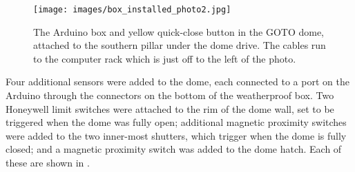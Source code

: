 \begin{colsection}
\begin{figure}[p]
    \begin{center}
        \texttt{[image: images/box\_installed\_photo2.jpg]}
    \end{center}
    \caption[The Arduino box and quick-close button in the GOTO dome]{
        The Arduino box and yellow quick-close button in the GOTO dome, attached to the southern pillar under the dome drive. The cables run to the computer rack which is just off to the left of the photo.
    }\label{fig:arduino_button_dome}
\end{figure}

\clearpage

Four additional sensors were added to the dome, each connected to a port on the Arduino through the connectors on the bottom of the weatherproof box. Two Honeywell limit switches were attached to the rim of the dome wall, set to be triggered when the dome was fully open; additional magnetic proximity switches were added to the two inner-most shutters, which trigger when the dome is fully closed; and a magnetic proximity switch was added to the dome hatch. Each of these are shown in .


\end{colsection}
